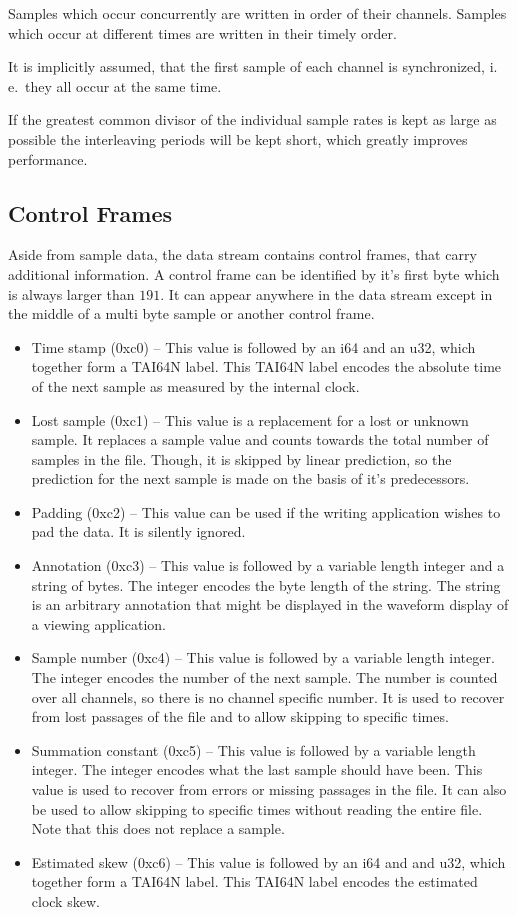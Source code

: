 \documentclass[DIV=10]{scrartcl}
\begin{document}
Samples which occur concurrently are written in order of their channels.
Samples which occur at different times are written in their timely order.

It is implicitly assumed, that the first sample of each channel is synchronized, i.\,e.\ they all occur at the same time.

If the greatest common divisor of the individual sample rates is kept as large as possible the interleaving periods will be kept short, which greatly improves performance.

\subsection{Control Frames}

Aside from sample data, the data stream contains control frames, that carry additional information.
A control frame can be identified by it’s first byte which is always larger than \(191\).
It can appear anywhere in the data stream except in the middle of a multi byte sample or another control frame.

\begin{itemize}
  \item Time stamp (0xc0) – This value is followed by an i64 and an u32, which together form a TAI64N label.
  This TAI64N label encodes the absolute time of the next sample as measured by the internal clock.
  \item Lost sample (0xc1) – This value is a replacement for a lost or unknown sample.
  It replaces a sample value and counts towards the total number of samples in the file.
  Though, it is skipped by linear prediction, so the prediction for the next sample is made on the basis of it’s predecessors.
  \item Padding (0xc2) – This value can be used if the writing application wishes to pad the data.
  It is silently ignored.
  \item Annotation (0xc3) – This value is followed by a variable length integer and a string of bytes.
  The integer encodes the byte length of the string.
  The string is an arbitrary annotation that might be displayed in the waveform display of a viewing application.
  \item Sample number (0xc4) – This value is followed by a variable length integer.
  The integer encodes the number of the next sample.
  The number is counted over all channels, so there is no channel specific number.
  It is used to recover from lost passages of the file and to allow skipping to specific times.
  \item Summation constant (0xc5) – This value is followed by a variable length integer.
  The integer encodes what the last sample should have been.
  This value is used to recover from errors or missing passages in the file.
  It can also be used to allow skipping to specific times without reading the entire file.
  Note that this does not replace a sample.
  \item Estimated skew (0xc6) – This value is followed by an i64 and and u32, which together form a TAI64N label.
  This TAI64N label encodes the estimated clock skew.
\end{itemize}
\end{document}
